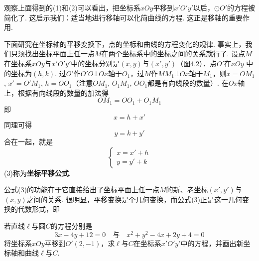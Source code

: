 观察上面得到的(1)和(2)可以看出，把坐标系$xOy$平移到$x'O'y'$以后，$\odot O'$的方程被简化了. 这启示我们：适当地进行移轴可以化简曲线的方程. 这正是移轴的重要作用.

下面研究在坐标轴的平移变换下，点的坐标和曲线的方程变化的规律. 事实上，我们只须找出坐标平面上任一点$M$在两个坐标系中的坐标之间的关系就行了. 设点$M$在坐标系$xOy$与$x'O'y'$中的坐标分别是$(x,y)$与$(x',y')$（图4.2）．点$O'$在$xOy$
中的坐标为$(h,k)$. 过$O'$作$O'O\bot Ox$轴于$O_1$，过$M$作$MM_1\bot Ox$轴于$M_1$，则$x=OM_1$, $x'=O'M_1$, $h=OO_1$（注意$OM_1$, $O_1M_1$, $OO_1$都是有向线段的数量）. 在$Ox$轴上，根据有向线段的数量的加法得
\[OM_1=OO_1+O_1M_1\]
即
\[x=h+x'\]
同理可得
\[y=k+y'\]
合在一起，就是
\begin{equation}
    \begin{cases}
        x=x'+h\\
        y=y'+k
    \end{cases}\tag{3}
\end{equation}
(3)称为\textbf{坐标平移公式}.

公式(3)的功能在于它直接给出了坐标平面上任一点$M$的新、老坐标$(x',y')$与$(x,y)$之间的关系. 很明显，平移变换是个几何变换，而公式(3)正是这一几何变换的代数形式，即
\begin{center}
\end{center}

\begin{example}
    若直线$\ell$与圆$C$的方程分别是
$$3x-4y+12=0\quad \text{与}\quad x^2+y^2-4x+2y+4=0$$
将坐标系$xOy$平移到$O'(2,-1)$，求$\ell$与$C$在坐标系$x'O'y'$中的方程，并画出新坐标轴和曲线$\ell$与$C$.
\end{example}

